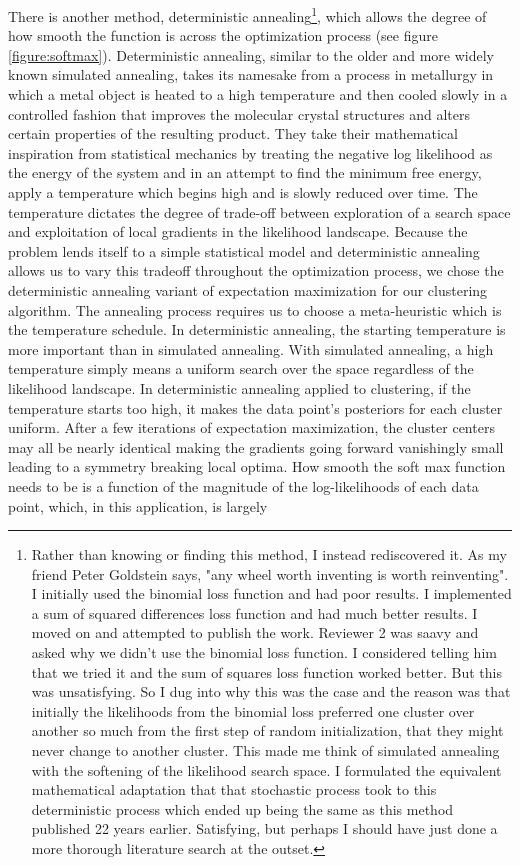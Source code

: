 \par{
There is another method, deterministic annealing\footnote{Rather than knowing or finding this method, I instead rediscovered it. As my friend Peter Goldstein says, "any wheel worth inventing is worth reinventing". I initially used the binomial loss function and had poor results. I implemented a sum of squared differences loss function and had much better results. I moved on and attempted to publish the work. Reviewer 2 was saavy and asked why we didn't use the binomial loss function. I considered telling him that we tried it and the sum of squares loss function worked better. But this was unsatisfying. So I dug into why this was the case and the reason was that initially the likelihoods from the binomial loss preferred one cluster over another so much from the first step of random initialization, that they might never change to another cluster. This made me think of simulated annealing with the softening of the likelihood search space. I formulated the equivalent mathematical adaptation that that stochastic process took to this deterministic process which ended up being the same as this method published 22 years earlier. Satisfying, but perhaps I should have just done a more thorough literature search at the outset. }, which allows the degree of how smooth the function is across the optimization process \cite{annealing}\cite{annealing2} (see figure \ref{figure:softmax}). Deterministic annealing, similar to the older and more widely known simulated annealing\cite{simannealing}, takes its namesake from a process in metallurgy in which a metal object is heated to a high temperature and then cooled slowly in a controlled fashion that improves the molecular crystal structures and alters certain properties of the resulting product. They take their mathematical inspiration from statistical mechanics by treating the negative log likelihood as the energy of the system and in an attempt to find the minimum free energy, apply a temperature which begins high and is slowly reduced over time. The temperature dictates the degree of trade-off between exploration of a search space and exploitation of local gradients in the likelihood landscape. Because the problem lends itself to a simple statistical model and deterministic annealing allows us to vary this tradeoff throughout the optimization process, we chose the deterministic annealing variant of expectation maximization for our clustering algorithm. The annealing process requires us to choose a meta-heuristic which is the temperature schedule. In deterministic annealing, the starting temperature is more important than in simulated annealing. With simulated annealing, a high temperature simply means a uniform search over the space regardless of the likelihood landscape. In deterministic annealing applied to clustering, if the temperature starts too high, it makes the data point's posteriors for each cluster uniform. After a few iterations of expectation maximization, the cluster centers may all be nearly identical making the gradients going forward vanishingly small leading to a symmetry breaking local optima. How smooth the soft max function needs to be is a function of the magnitude of the log-likelihoods of each data point, which, in this application, is largely }
